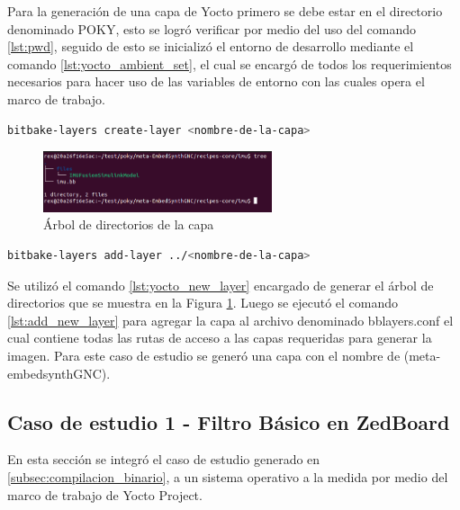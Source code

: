 Para la generación de una capa de Yocto primero se debe estar en el directorio denominado POKY, esto se logró verificar por medio del uso del comando \ref{lst:pwd}, seguido de esto se inicializó el entorno de desarrollo mediante el comando \ref{lst:yocto_ambient_set}, el cual se encargó de todos los requerimientos necesarios para  hacer uso de las variables de entorno con las cuales opera el marco de trabajo.

\begin{lstlisting}[language=bash, caption={Generar nueva capa, Yocto }, label=lst:yocto_new_layer]
    bitbake-layers create-layer <nombre-de-la-capa>
\end{lstlisting}

\begin{figure}[h!]
    \centering
    \includegraphics[width=0.6\textwidth]{fig/Capitulo5/Caso_de_estudio_IMU/retornos_consola/Screenshot from 2024-10-31 20-35-20.png}
    \caption{Árbol de directorios de la capa}
    \label{fig:arbol_capa_custom_yocto}
\end{figure}

\begin{lstlisting}[language=bash, caption={Agregar nueva capa, Yocto }, label=lst:add_new_layer]
    bitbake-layers add-layer ../<nombre-de-la-capa>
\end{lstlisting}

Se utilizó el comando \ref{lst:yocto_new_layer} encargado de generar el árbol de directorios que se muestra en la Figura \ref{fig:arbol_capa_custom_yocto}. Luego se ejecutó el comando \ref{lst:add_new_layer} para agregar la capa al archivo denominado bblayers.conf el cual contiene todas las rutas de acceso a las capas requeridas para generar la imagen. Para este caso de estudio se generó una capa con el nombre de (meta-embedsynthGNC).


\subsection{Caso de estudio 1 - Filtro Básico en ZedBoard}

En esta sección se integró el caso de estudio generado en \ref{subsec:compilacion_binario}, a un sistema operativo a la medida por medio del marco de trabajo de Yocto Project.

